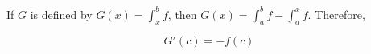 \documentclass[11pt]{scrartcl}
\begin{document}
\begin{note*}
  If $G$ is defined by $G(x) = \int_{x}^bf$, then
  $G(x) = \int_a^b f - \int_a^x f$. Therefore,


  \begin{equation*}
    G'(c)  = - f(c)
  \end{equation*}

\end{note*}
\end{document}
